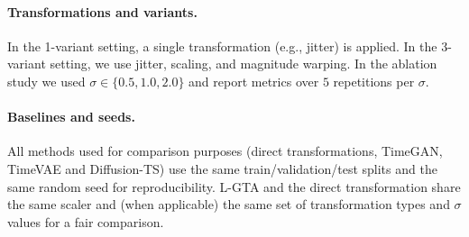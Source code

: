 \paragraph{Transformations and variants.}
In the 1-variant setting, a single transformation (e.g., jitter) is applied. In the 3-variant setting, we use jitter, scaling, and magnitude warping. In the ablation study we used $\sigma \in \{0.5, 1.0, 2.0\}$ and report metrics over $5$ repetitions per $\sigma$. 

\paragraph{Baselines and seeds.}
All methods used for comparison purposes (direct transformations, TimeGAN, TimeVAE and Diffusion-TS) use the same train/validation/test splits and the same random seed for reproducibility. L-GTA and the direct transformation share the same scaler and (when applicable) the same set of transformation types and $\sigma$ values for a fair comparison.
